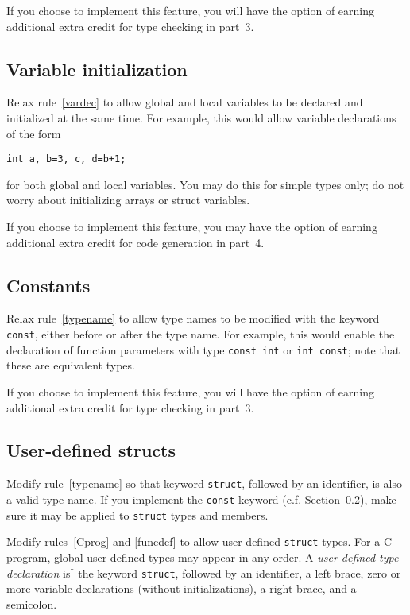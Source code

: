 \documentclass{article}
\newcommand{\iseasier}{is$^\dagger$ }
\newcommand{\typecheck}{3}
\newcommand{\codegen}{4}
\begin{document}
If you choose to implement this feature,
you will have the option of earning
additional extra credit for type checking
in part~\typecheck.



\subsection{Variable initialization}
\label{SEC:varinit}

Relax rule~\ref{vardec} to allow global and local variables to be
declared and initialized at the same time.
For example, this would allow variable declarations of the form
\begin{lstlisting}[numbers=none]
  int a, b=3, c, d=b+1;
\end{lstlisting}
for both global and local variables.
You may do this for simple types only;
do not worry about initializing arrays or struct variables.

If you choose to implement this feature,
you may have the option of earning
additional extra credit for code generation
in part~\codegen.

\subsection{Constants}
\label{SEC:constants}

Relax rule~\ref{typename} to allow type names to be modified
with the keyword {\tt const}, either before or after the type name.
For example,
this would enable the declaration of function parameters
with type \lstinline{const int} or \lstinline{int const};
note that these are equivalent types.

If you choose to implement this feature,
you will have the option of earning
additional extra credit for type checking
in part~\typecheck.


\subsection{User-defined structs}
\label{SEC:userstructs}

Modify rule~\ref{typename} so that keyword {\tt struct},
followed by an identifier,
is also a valid type name.
If you implement the {\tt const} keyword (c.f. Section~\ref{SEC:constants}),
make sure it may be applied to {\tt struct} types
and members.

Modify rules~\ref{Cprog} and \ref{funcdef} to allow user-defined
{\tt struct} types.
For a C program, global user-defined types may appear in any order.
A \emph{user-defined type declaration} \iseasier the keyword {\tt struct},
followed by an identifier, a left brace,
  zero or more variable declarations (without initializations),
a right brace, and a semicolon.
\end{document}
